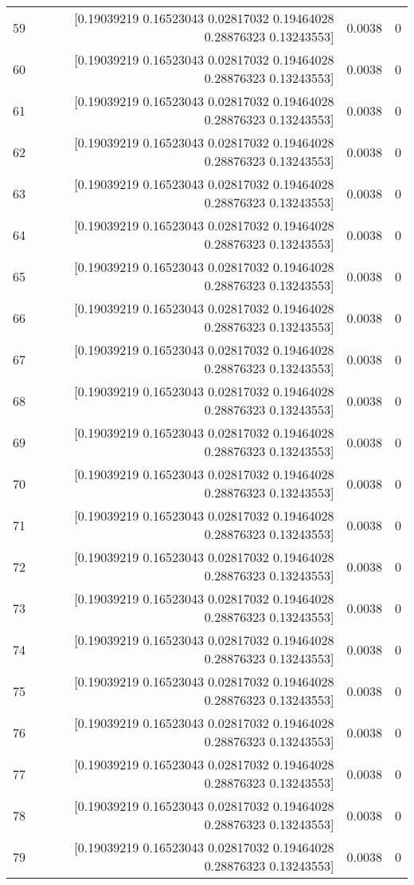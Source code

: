 \begin{longtable}{lrrr}
59 & [0.19039219 0.16523043 0.02817032 0.19464028 0.28876323 0.13243553] & 0.0038 & 0 \\
60 & [0.19039219 0.16523043 0.02817032 0.19464028 0.28876323 0.13243553] & 0.0038 & 0 \\
61 & [0.19039219 0.16523043 0.02817032 0.19464028 0.28876323 0.13243553] & 0.0038 & 0 \\
62 & [0.19039219 0.16523043 0.02817032 0.19464028 0.28876323 0.13243553] & 0.0038 & 0 \\
63 & [0.19039219 0.16523043 0.02817032 0.19464028 0.28876323 0.13243553] & 0.0038 & 0 \\
64 & [0.19039219 0.16523043 0.02817032 0.19464028 0.28876323 0.13243553] & 0.0038 & 0 \\
65 & [0.19039219 0.16523043 0.02817032 0.19464028 0.28876323 0.13243553] & 0.0038 & 0 \\
66 & [0.19039219 0.16523043 0.02817032 0.19464028 0.28876323 0.13243553] & 0.0038 & 0 \\
67 & [0.19039219 0.16523043 0.02817032 0.19464028 0.28876323 0.13243553] & 0.0038 & 0 \\
68 & [0.19039219 0.16523043 0.02817032 0.19464028 0.28876323 0.13243553] & 0.0038 & 0 \\
69 & [0.19039219 0.16523043 0.02817032 0.19464028 0.28876323 0.13243553] & 0.0038 & 0 \\
70 & [0.19039219 0.16523043 0.02817032 0.19464028 0.28876323 0.13243553] & 0.0038 & 0 \\
71 & [0.19039219 0.16523043 0.02817032 0.19464028 0.28876323 0.13243553] & 0.0038 & 0 \\
72 & [0.19039219 0.16523043 0.02817032 0.19464028 0.28876323 0.13243553] & 0.0038 & 0 \\
73 & [0.19039219 0.16523043 0.02817032 0.19464028 0.28876323 0.13243553] & 0.0038 & 0 \\
74 & [0.19039219 0.16523043 0.02817032 0.19464028 0.28876323 0.13243553] & 0.0038 & 0 \\
75 & [0.19039219 0.16523043 0.02817032 0.19464028 0.28876323 0.13243553] & 0.0038 & 0 \\
76 & [0.19039219 0.16523043 0.02817032 0.19464028 0.28876323 0.13243553] & 0.0038 & 0 \\
77 & [0.19039219 0.16523043 0.02817032 0.19464028 0.28876323 0.13243553] & 0.0038 & 0 \\
78 & [0.19039219 0.16523043 0.02817032 0.19464028 0.28876323 0.13243553] & 0.0038 & 0 \\
79 & [0.19039219 0.16523043 0.02817032 0.19464028 0.28876323 0.13243553] & 0.0038 & 0 \\

\end{longtable}

